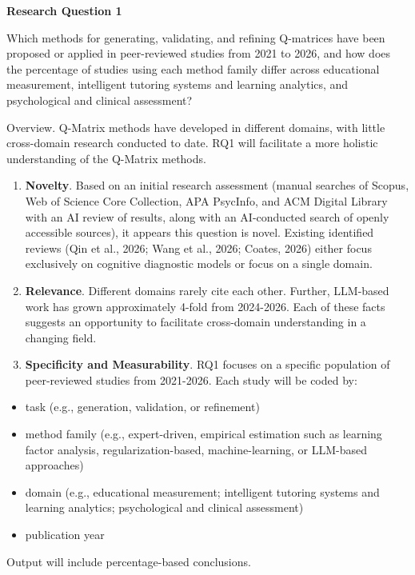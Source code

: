 \documentclass[sigconf]{acmart}
\begin{document}
\textbf{Research Question 1}

Which methods for generating, validating, and refining Q-matrices have been proposed or applied in peer-reviewed studies from 2021 to 2026, and how does the percentage of studies using each method family differ across educational measurement, intelligent tutoring systems and learning analytics, and psychological and clinical assessment?

Overview. Q-Matrix methods have developed in different domains, with little cross-domain research conducted to date. RQ1 will facilitate a more holistic understanding of the Q-Matrix methods.

\begin{enumerate}
    \item \textbf{Novelty}. Based on an initial research assessment (manual searches of Scopus, Web of Science Core Collection, APA PsycInfo, and ACM Digital Library with an AI review of results, along with an AI-conducted search of openly accessible sources), it appears this question is novel. Existing identified reviews (Qin et al., 2026; Wang et al., 2026; Coates, 2026) either focus exclusively on cognitive diagnostic models or focus on a single domain.
    \item \textbf{Relevance}. Different domains rarely cite each other. Further, LLM-based work has grown approximately 4-fold from 2024-2026. Each of these facts suggests an opportunity to facilitate cross-domain understanding in a changing field.
    \item \textbf{Specificity and Measurability}. RQ1 focuses on a specific population of peer-reviewed studies from 2021-2026. Each study will be coded by:
\end{enumerate}

\begin{itemize}
    \item task (e.g., generation, validation, or refinement)
    \item method family (e.g., expert-driven, empirical estimation such as learning factor analysis, regularization-based, machine-learning, or LLM-based approaches)
    \item domain (e.g., educational measurement; intelligent tutoring systems and learning analytics; psychological and clinical assessment)
    \item publication year
\end{itemize}
Output will include percentage-based conclusions.
\end{document}
